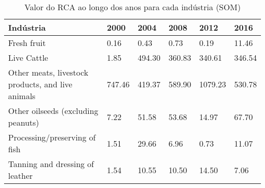 \begin{table}
\centering
\caption{Valor do RCA ao longo dos anos para cada indústria (SOM)}
\label{tab:ex3-tempo-SOM}
\begin{tabular}{p{6cm}p{1.5cm}p{1.5cm}p{1.5cm}p{1.5cm}p{1.5cm}}
\toprule
                                        Indústria &   2000 &   2004 &   2008 &    2012 &   2016 \\
\midrule
                                      Fresh fruit &   0.16 &   0.43 &   0.73 &    0.19 &  11.46 \\
                                      Live Cattle &   1.85 & 494.30 & 360.83 &  340.61 & 346.54 \\
Other meats, livestock products, and live animals & 747.46 & 419.37 & 589.90 & 1079.23 & 530.78 \\
               Other oilseeds (excluding peanuts) &   7.22 &  51.58 &  53.68 &   14.97 &  67.70 \\
                    Processing/preserving of fish &   1.51 &  29.66 &   6.96 &    0.73 &  11.07 \\
                  Tanning and dressing of leather &   1.54 &  10.55 &  10.50 &   14.50 &   7.06 \\
\bottomrule
\end{tabular}
\end{table}
